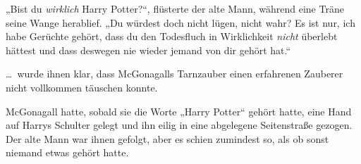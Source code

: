 „Bist du \emph{wirklich} Harry Potter?“, flüsterte der alte Mann, während eine Träne seine Wange herablief.
„Du würdest doch nicht lügen, nicht wahr? Es ist nur, ich habe Gerüchte gehört, dass du den Todesfluch in Wirklichkeit \emph{nicht} überlebt hättest und dass deswegen nie wieder jemand von dir gehört hat.“

… wurde ihnen klar, dass McGonagalls Tarnzauber einen erfahrenen Zauberer nicht vollkommen täuschen konnte.

McGonagall hatte, sobald sie die Worte „Harry Potter“ gehört hatte, eine Hand auf Harrys Schulter gelegt und ihn eilig in eine abgelegene Seitenstraße gezogen. Der alte Mann war ihnen gefolgt, aber es schien zumindest so, als ob sonst niemand etwas gehört hatte.

